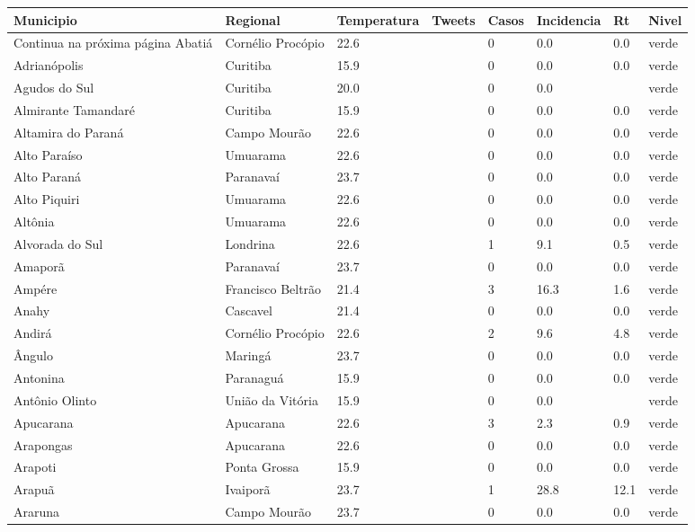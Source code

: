 \begin{longtable}{l|lllllll}
  \hline
Municipio & Regional & Temperatura & Tweets & Casos & Incidencia & Rt & Nivel \\ 
  \hline
\endhead
\hline
{\footnotesize Continua na próxima página}
\endfoot
\endlastfoot
Abatiá & Cornélio Procópio & 22.6 &  & 0 & 0.0 & 0.0 & verde \\ 
  Adrianópolis & Curitiba & 15.9 &  & 0 & 0.0 & 0.0 & verde \\ 
  Agudos do Sul & Curitiba & 20.0 &  & 0 & 0.0 &  & verde \\ 
  Almirante Tamandaré & Curitiba & 15.9 &  & 0 & 0.0 & 0.0 & verde \\ 
  Altamira do Paraná & Campo Mourão & 22.6 &  & 0 & 0.0 & 0.0 & verde \\ 
  Alto Paraíso & Umuarama & 22.6 &  & 0 & 0.0 & 0.0 & verde \\ 
  Alto Paraná & Paranavaí & 23.7 &  & 0 & 0.0 & 0.0 & verde \\ 
  Alto Piquiri & Umuarama & 22.6 &  & 0 & 0.0 & 0.0 & verde \\ 
  Altônia & Umuarama & 22.6 &  & 0 & 0.0 & 0.0 & verde \\ 
  Alvorada do Sul & Londrina & 22.6 &  & 1 & 9.1 & 0.5 & verde \\ 
  Amaporã & Paranavaí & 23.7 &  & 0 & 0.0 & 0.0 & verde \\ 
  Ampére & Francisco Beltrão & 21.4 &  & 3 & 16.3 & 1.6 & verde \\ 
  Anahy & Cascavel & 21.4 &  & 0 & 0.0 & 0.0 & verde \\ 
  Andirá & Cornélio Procópio & 22.6 &  & 2 & 9.6 & 4.8 & verde \\ 
  Ângulo & Maringá & 23.7 &  & 0 & 0.0 & 0.0 & verde \\ 
  Antonina & Paranaguá & 15.9 &  & 0 & 0.0 & 0.0 & verde \\ 
  Antônio Olinto & União da Vitória & 15.9 &  & 0 & 0.0 &  & verde \\ 
  Apucarana & Apucarana & 22.6 &  & 3 & 2.3 & 0.9 & verde \\ 
  Arapongas & Apucarana & 22.6 &  & 0 & 0.0 & 0.0 & verde \\ 
  Arapoti & Ponta Grossa & 15.9 &  & 0 & 0.0 & 0.0 & verde \\ 
  Arapuã & Ivaiporã & 23.7 &  & 1 & 28.8 & 12.1 & verde \\ 
  Araruna & Campo Mourão & 23.7 &  & 0 & 0.0 & 0.0 & verde \\ 

\end{longtable}
